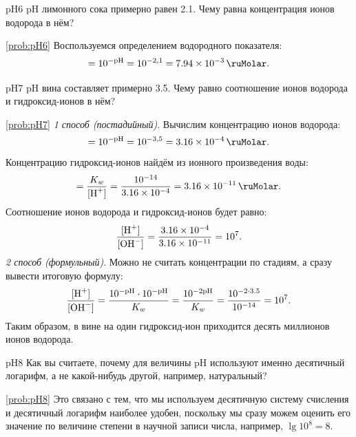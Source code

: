 \begin{problem}{}{pH6}
    pH лимонного сока примерно равен \num{2,1}. Чему равна концентрация ионов водорода в нём?
    \begin{sol}{\ref{prob:pH6}}
        Воспользуемся определением водородного показателя:
        \begin{equation*}
            [\ce{H^+}] = 10^{-\text{pH}} = 10^{-2,1} = \qty{7,94e-3}{\ruMolar}.
        \end{equation*}
    \end{sol}
\end{problem}

\begin{problem}{}{pH7}
    pH вина составляет примерно \num{3,5}. Чему равно соотношение ионов водорода и гидроксид-ионов в нём?
    \begin{sol}{\ref{prob:pH7}}
        \textit{1 способ (постадийный)}. Вычислим концентрацию ионов водорода:
        \begin{equation*}
            [\ce{H^+}] = 10^{-\text{pH}} = 10^{-3,5} = \qty{3,16e-4}{\ruMolar}.
        \end{equation*}
        Концентрацию гидроксид-ионов найдём из ионного произведения воды:
        \begin{equation*}
            [\ce{OH^-}] = \frac{K_w}{[\ce{H^+}]} = \frac{10^{-14}}{\num{3,16e-4}} = \qty{3,16e-11}{\ruMolar}.
        \end{equation*}
        Соотношение ионов водорода и гидроксид-ионов будет равно:
        \begin{equation*}
            \frac{[\ce{H^+}]}{[\ce{OH^-}]} = \frac{\num{3,16e-4}}{\num{3,16e-11}} = 10^7.
        \end{equation*}
        \textit{2 способ (формульный)}. Можно не считать концентрации по стадиям, а сразу вывести итоговую формулу:
        \begin{equation*}
            \frac{[\ce{H^+}]}{[\ce{OH^-}]} = \frac{10^{-\text{pH}} \cdot 10^{-\text{pH}}}{K_w} = \frac{10^{-2\text{pH}}}{K_w} = \frac{10^{-2 \cdot \num{3,5}}}{10^{-14}} = 10^7.
        \end{equation*}
        Таким образом, в вине на один гидроксид-ион приходится десять миллионов ионов водорода.
    \end{sol}
\end{problem}

\begin{problem}{}{pH8}
    Как вы считаете, почему для величины pH используют именно десятичный логарифм, а не какой-нибудь другой, например, натуральный?
    \begin{sol}{\ref{prob:pH8}}
        Это связано с тем, что мы используем десятичную систему счисления и десятичный логарифм наиболее удобен, поскольку мы сразу можем оценить его значение по величине степени в научной записи числа, например, $\lg10^8 = 8$.
    \end{sol}
\end{problem}

